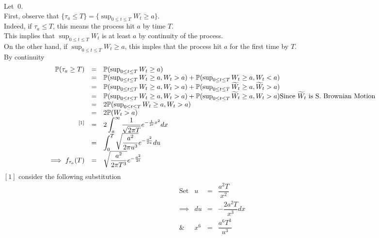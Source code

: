 \documentclass[11pt,a4paper]{article}
\begin{document}
Let $\>0$.\\
First, observe that $\{\tau_a\leq T\}=\{\sup_{0\leq t\leq T}W_t\geq a\}$.\\
Indeed, if $\tau_a\leq T$, this means the process hit $a$ by time $T$.\\
This implies that $\sup_{0\leq t\leq T}W_t$ is at least $a$ by continuity of the process.\\
On the other hand, if $\sup_{0\leq t\leq T}W_t\geq a$, this imples that the process hit $a$ for the first time by $T$.\\
By continuity
\[\begin{array}{rcl}
\prob(\tau_a\geq T)&=&\prob(\sup_{0\leq t\leq T}W_t\geq a)\\
&=&\prob(\sup_{0\leq t\leq T}W_t\geq a,W_t>a)+\prob(\sup_{0\leq t\leq T}W_t\geq a,W_t<a)\\
&=&\prob(\sup_{0\leq t\leq T}W_t\geq a,W_t>a)+\prob(\sup_{0\leq t\leq T}\widetilde{W}_t\geq a,\widetilde{W}_t>a)\\
&=&\prob(\sup_{0\leq t\leq T}W_t\geq a,W_t>a)+\prob(\sup_{0\leq t\leq T}\widetilde{W}_t\geq a,W_t>a)\mathrm{Since\ }\widetilde{W}_t\ \mathrm{is\ S.\ Brownian\ Motion}\\
&=&2\prob(\sup_{0\leq t\leq T}W_t\geq a,W_t>a)\\
&=&2\prob(W_t>a)\\
^{[1]}&=&{\displaystyle2\int_{a}^\infty\frac{1}{\sqrt{2\pi T}}e^{-\frac{1}{2t}x^2}dx}\\
&=&{\displaystyle\int_0^T\sqrt{\dfrac{a^2}{2\pi u^3}}e^{-\frac{a^2}{2u}}du}\\
\implies f_{\tau_a}(T)&=&\sqrt{\dfrac{a^2}{2\pi T^3}}e^{-\frac{a^2}{2t}}
\end{array}\]
$[1]$ consider the following substitution
\[\begin{array}{rrcl}
\mathrm{Set}&u&=&\dfrac{a^2T}{x^2}\\
\implies&du&=&-\dfrac{2a^2T}{x^3}dx\\
\&&x^6&=&\dfrac{a^6T^3}{u^3}
\end{array}\]

\end{document}
